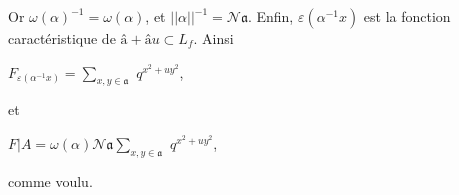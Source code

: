 \documentclass[11pt]{article}
\begin{document}
\par
Or \(\omega (\alpha )^{-1}=\omega (\alpha )\), et \(\vert \vert \alpha \vert \vert ^{-1}=\mathcal{N}𝔞\). Enfin, \(\varepsilon (\alpha ^{-1}x)\) est la fonction caractéristique de \(\text{â}+\text{â}u\subset L_{f}\). Ainsi\par
\par
\(F_{\varepsilon (\alpha ^{-1}x)}=\sum _{x,y\in 𝔞}\) \(q^{x^{2}+uy^{2}}\),\par
\par
et\par
\par
\(F\vert A=\omega (\alpha )\mathcal{N}𝔞\sum _{x,y\in 𝔞}\) \(q^{x^{2}+uy^{2}}\),\par
\par
comme voulu.\par
\par
\end{document}
